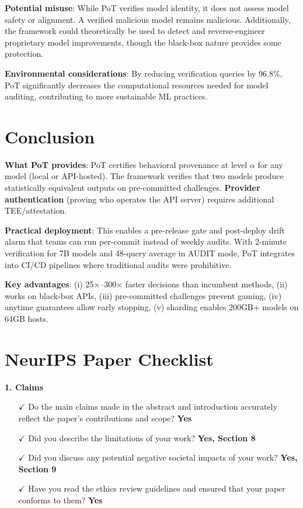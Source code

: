 \documentclass{article}
\begin{document}
\textbf{Potential misuse}: While PoT verifies model identity, it does not assess model safety or alignment. A verified malicious model remains malicious. Additionally, the framework could theoretically be used to detect and reverse-engineer proprietary model improvements, though the black-box nature provides some protection.

\textbf{Environmental considerations}: By reducing verification queries by 96.8\%, PoT significantly decreases the computational resources needed for model auditing, contributing to more sustainable ML practices.

\section{Conclusion}

\textbf{What PoT provides}: PoT certifies behavioral provenance at level $\alpha$ for any model (local or API-hosted). The framework verifies that two models produce statistically equivalent outputs on pre-committed challenges. \textbf{Provider authentication} (proving who operates the API server) requires additional TEE/attestation.

\textbf{Practical deployment}: This enables a pre-release gate and post-deploy drift alarm that teams can run per-commit instead of weekly audits. With 2-minute verification for 7B models and 48-query average in AUDIT mode, PoT integrates into CI/CD pipelines where traditional audits were prohibitive.

\textbf{Key advantages}: (i) 25×--300× faster decisions than incumbent methods, (ii) works on black-box APIs, (iii) pre-committed challenges prevent gaming, (iv) anytime guarantees allow early stopping, (v) sharding enables 200GB+ models on 64GB hosts.




\appendix

\section*{NeurIPS Paper Checklist}

\textbf{1. Claims}
\begin{itemize}
\item[$\checkmark$] Do the main claims made in the abstract and introduction accurately reflect the paper's contributions and scope? \textbf{Yes}
\item[$\checkmark$] Did you describe the limitations of your work? \textbf{Yes, Section 8}
\item[$\checkmark$] Did you discuss any potential negative societal impacts of your work? \textbf{Yes, Section 9}
\item[$\checkmark$] Have you read the ethics review guidelines and ensured that your paper conforms to them? \textbf{Yes}
\end{itemize}
\end{document}
